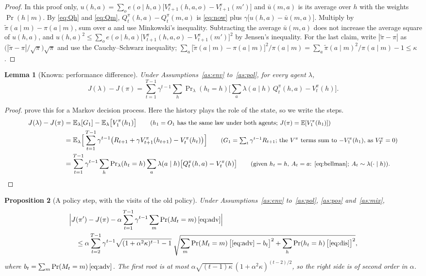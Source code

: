 \documentclass{article}
\newtheorem{proposition}{Proposition}[section]
\newtheorem{lemma}[proposition]{Lemma}
\theoremstyle{definition}
\newcommand{\E}{\mathbb{E}}
\newcommand{\Prl}{\Pr\nolimits_{\lambda}}
\newcommand{\why}[1]{\tag*{\small(#1)}}
\begin{document}
\begin{proof}
In this proof only, $u(h,a)=\sum_oe(o\mid h,a)\big[V^\pi_{t+1}(h,a,o)-V^\pi_{t+1}(m')\big]$ and $\bar u(m,a)$ is its average over $h$ with the weights $\Pr(h\mid m)$. By \eqref{eq:Qh} and \eqref{eq:Qm}, $Q^\pi_t(h,a)-Q^\pi_t(m,a)$ is \eqref{eq:now} plus $\gamma\big[u(h,a)-\bar u(m,a)\big]$. Multiply by $\tilde\pi(a\mid m)-\pi(a\mid m)$, sum over $a$ and use Minkowski's inequality. Subtracting the average $\bar u(m,a)$ does not increase the average square of $u(h,a)$, and $u(h,a)^2\le\sum_oe(o\mid h,a)\big[V^\pi_{t+1}(h,a,o)-V^\pi_{t+1}(m')\big]^2$ by Jensen's inequality. For the last claim, write $|\tilde\pi-\pi|$ as $\big(|\tilde\pi-\pi|/\sqrt\pi\big)\sqrt\pi$ and use the Cauchy--Schwarz inequality; $\sum_a\big[\tilde\pi(a\mid m)-\pi(a\mid m)\big]^2/\pi(a\mid m)=\sum_a\tilde\pi(a\mid m)^2/\pi(a\mid m)-1\le\kappa$.
\end{proof}

\begin{lemma}[Known: performance difference]\label{lem:pdl}
Under Assumptions~\ref{as:env} to~\ref{as:pol}, for every agent $\lambda$,
\[
J(\lambda)-J(\pi)=\sum_{t=1}^{T-1}\gamma^{t-1}\sum_h\Prl (h_t=h)\Big[\sum_a\lambda(a\mid h)\,Q^\pi_t(h,a)-V^\pi_t(h)\Big].
\]
\end{lemma}

\begin{proof}
\citet{kakade2002cpi} prove this for a Markov decision process. Here the history plays the role of the state, so we write the steps.
\begin{align*}
J(\lambda)-J(\pi)
&=\E_\lambda[G_1]-\E_\lambda\big[V^\pi_1(h_1)\big] \why{$h_1=O_1$ has the same law under both agents; $J(\pi)=\E[V^\pi_1(h_1)]$}\\
&=\E_\lambda\Big[\sum_{t=1}^{T-1}\gamma^{t-1}\big(R_{t+1}+\gamma V^\pi_{t+1}(h_{t+1})-V^\pi_t(h_t)\big)\Big] \why{$G_1=\sum_t\gamma^{t-1}R_{t+1}$; the $V^\pi$ terms sum to $-V^\pi_1(h_1)$, as $V^\pi_T=0$}\\
&=\sum_{t=1}^{T-1}\gamma^{t-1}\sum_h\Prl (h_t=h)\sum_a\lambda(a\mid h)\big[Q^\pi_t(h,a)-V^\pi_t(h)\big] \why{given $h_t=h$, $A_t=a$: \eqref{eq:bellman}; $A_t\sim\lambda(\cdot\mid h)$}.
\end{align*}
\end{proof}

\begin{proposition}[A policy step, with the visits of the old policy]\label{prop:round}
Under Assumptions~\ref{as:env} to~\ref{as:pol}, \ref{as:pos} and~\ref{as:mix},
\begin{align*}
&\Big|J(\pi')-J(\pi)-\alpha\sum_{t=1}^{T-1}\gamma^{t-1}\sum_m\Pr(M_t=m)\,\eqref{eq:adv}\Big|\\
&\quad\le\alpha\sum_{t=2}^{T-1}\gamma^{t-1}\sqrt{(1+\alpha^2\kappa)^{t-1}-1}\;\sqrt{\sum_m\Pr(M_t=m)\,\big[\eqref{eq:adv}-b_t\big]^2+\sum_h\Pr(h_t=h)\,\big[\eqref{eq:dis}\big]^2},
\end{align*}
where $b_t=\sum_m\Pr(M_t=m)\,\eqref{eq:adv}$. The first root is at most $\alpha\sqrt{(t-1)\kappa}\,(1+\alpha^2\kappa)^{(t-2)/2}$, so the right side is of second order in $\alpha$.
\end{proposition}
\end{document}
